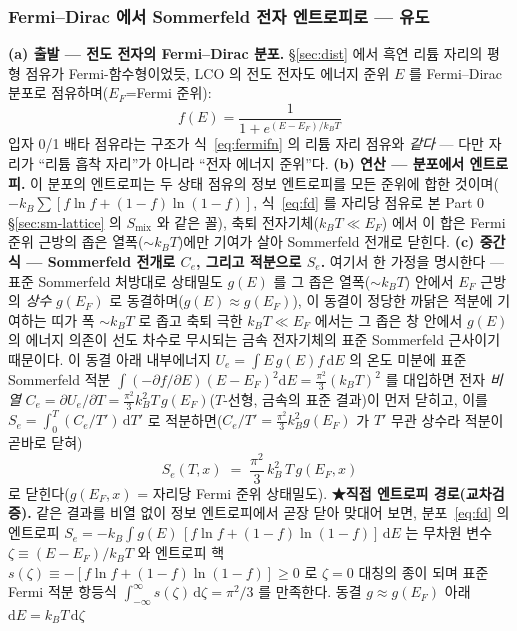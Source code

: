 \documentclass[11pt,a4paper]{article}
\newcommand{\dd}{\mathrm{d}}
\begin{document}
\subsubsection{Fermi--Dirac 에서 Sommerfeld 전자 엔트로피로 — 유도}\label{sec:lco-Se}
\textbf{(a) 출발 — 전도 전자의 Fermi--Dirac 분포.} \S\ref{sec:dist} 에서 흑연 리튬 자리의 평형 점유가 Fermi-함수형이었듯, LCO 의 전도 전자도 에너지 준위 $E$ 를
Fermi--Dirac 분포로 점유하며($E_F$=Fermi 준위):
\begin{equation}
f(E)=\frac{1}{1+e^{(E-E_F)/k_BT}}
\label{eq:fd}
\end{equation}
입자 0/1 배타 점유라는 구조가 식~\eqref{eq:fermifn} 의 리튬 자리 점유와 \emph{같다} — 다만 자리가 ``리튬 흡착
자리''가 아니라 ``전자 에너지 준위''다. \textbf{(b) 연산 — 분포에서 엔트로피.} 이 분포의 엔트로피는 두 상태 점유의 정보 엔트로피를 모든 준위에 합한 것이며($-k_B\sum[f\ln f+(1-f)\ln(1-f)]$,
식~\eqref{eq:fd} 를 자리당 점유로 본 Part 0 \S\ref{sec:sm-lattice} 의 $S_\mathrm{mix}$ 와 같은 꼴), 축퇴 전자기체($k_BT\!\ll\!E_F$)
에서 이 합은 Fermi 준위 근방의 좁은 열폭($\sim k_BT$)에만 기여가 살아 Sommerfeld 전개로 닫힌다. \textbf{(c) 중간식 — Sommerfeld 전개로 $C_e$, 그리고 적분으로 $S_e$.}
여기서 한 가정을 명시한다 — 표준 Sommerfeld 처방대로 상태밀도 $g(E)$ 를 그 좁은 열폭($\sim k_BT$) 안에서 $E_F$
근방의 \emph{상수} $g(E_F)$ 로 동결하며($g(E)\approx g(E_F)$), 이 동결이 정당한 까닭은 적분에 기여하는 띠가 폭
$\sim k_BT$ 로 좁고 축퇴 극한 $k_BT\!\ll\!E_F$ 에서는 그 좁은 창 안에서 $g(E)$ 의 에너지 의존이 선도 차수로
무시되는 금속 전자기체의 표준 Sommerfeld 근사이기 때문이다. 이 동결 아래 내부에너지 $U_e=\int E\,g(E)f\,\dd E$ 의
온도 미분에 표준 Sommerfeld 적분 $\int(-\partial f/\partial E)(E-E_F)^2\dd E=\tfrac{\pi^2}{3}(k_BT)^2$ 를 대입하면
전자 \emph{비열} $C_e=\partial U_e/\partial T=\tfrac{\pi^2}{3}k_B^2T\,g(E_F)$($T$-선형, 금속의 표준 결과)이 먼저
닫히고, 이를 $S_e=\int_0^T (C_e/T')\,\dd T'$ 로 적분하면($C_e/T'=\tfrac{\pi^2}{3}k_B^2g(E_F)$ 가 $T'$ 무관 상수라
적분이 곧바로 닫혀)
\begin{equation}
S_e(T,x)\;=\;\frac{\pi^2}{3}\,k_B^2\,T\,g(E_F,x)
\label{eq:Se}
\end{equation}
로 닫힌다($g(E_F,x)$ = 자리당 Fermi 준위 상태밀도). \textbf{★직접 엔트로피 경로(교차검증).} 같은 결과를 비열 없이 정보 엔트로피에서 곧장 닫아 맞대어 보면, 분포~\eqref{eq:fd} 의 엔트로피
$S_e=-k_B\int g(E)\,[f\ln f+(1-f)\ln(1-f)]\,\dd E$ 는 무차원 변수 $\zeta\equiv(E-E_F)/k_BT$ 와 엔트로피 핵
$s(\zeta)\equiv-[f\ln f+(1-f)\ln(1-f)]\ge0$ 로 $\zeta=0$ 대칭의 종이 되며 표준 Fermi 적분 항등식
$\int_{-\infty}^{\infty}s(\zeta)\,\dd\zeta=\pi^2/3$ 를 만족한다. 동결 $g\approx g(E_F)$ 아래 $\dd E=k_BT\,\dd\zeta$
\end{document}
